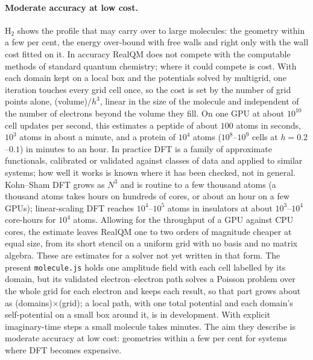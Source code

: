 \documentclass[11pt]{article}
\begin{document}
\paragraph{Moderate accuracy at low cost.} H$_2$ shows the profile that may carry over to large molecules:
the geometry within a few per cent, the energy over-bound with free walls and right only with the wall cost
fitted on it. In accuracy RealQM
does not compete with the computable methods of standard quantum chemistry; where it could compete is cost. With each
domain kept on a local box and the potentials solved by multigrid, one iteration touches every grid cell once,
so the cost is set by the number of grid points alone, (volume)$/h^3$, linear in the size of the molecule and
independent of the number of electrons beyond the volume they fill. On one GPU at about $10^{10}$ cell updates
per second, this estimates a peptide of about $100$ atoms in seconds, $10^3$ atoms in about a minute, and a protein
of $10^4$ atoms ($10^8$--$10^9$ cells at $h = 0.2$--$0.1$) in minutes to an hour. In practice DFT is a family of approximate
functionals, calibrated or validated against classes of data and applied to similar systems; how well it works is
known where it has been checked, not in general. Kohn--Sham DFT grows as $N^3$ and
is routine to a few thousand atoms (a thousand atoms takes hours on hundreds of cores, or about an hour on a few
GPUs); linear-scaling DFT reaches $10^4$--$10^5$ atoms in insulators at about $10^3$--$10^4$ core-hours for $10^4$
atoms. Allowing for the throughput of a GPU against CPU cores, the estimate leaves RealQM one to two orders of
magnitude cheaper at equal size, from its short stencil on a uniform grid with no basis and no matrix algebra.
These are estimates for a solver not yet written in that form. The present \texttt{molecule.js} holds one
amplitude field with each cell labelled by its domain, but its validated electron--electron path solves a
Poisson problem over the whole grid for each electron and keeps each result, so that part grows about as
(domains)$\times$(grid); a local path, with one total potential and each domain's self-potential on a small box
around it, is in development. With explicit imaginary-time steps a small molecule takes minutes. The aim they describe is moderate accuracy at low cost: geometries within a
few per cent for systems where DFT becomes expensive.

\end{document}

